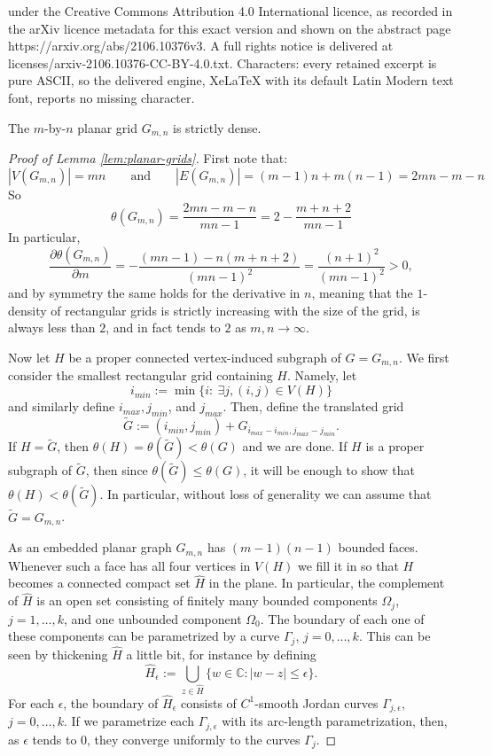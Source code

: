 \documentclass[10pt,a4paper]{amsart}
\newcommand{\C}{\mathbb{C}}
\newcommand{\Ga}{\Gamma }
\newcommand{\Om}{\Omega }
\newcommand{\ep}{\epsilon }
\begin{document}
under the Creative Commons Attribution 4.0 International licence, as recorded in the arXiv licence metadata for this exact version and shown on the abstract page https://arxiv.org/abs/2106.10376v3. A full rights notice is delivered at licenses/arxiv-2106.10376-CC-BY-4.0.txt. Characters: every retained excerpt is pure ASCII, so the delivered engine, XeLaTeX with its default Latin Modern text font, reports no missing character.
\begin{lemma}\label{lem:planar-grids}
 The $m$-by-$n$ planar grid $G_{m,n}$ is strictly dense.
\end{lemma}

\begin{proof}[Proof of Lemma \ref{lem:planar-grids}]
First note that:
\[
|V(G_{m,n})|=mn\qquad\text{and}\qquad |E(G_{m,n})|=(m-1)n+m(n-1)=2mn-m-n
\]
So
\[
\theta(G_{m,n})=\frac{2mn-m-n}{mn-1}=2-\frac{m+n+2}{mn-1}
\]
In particular,
\[
\frac{\partial \theta(G_{m,n})}{\partial m}=-\frac{(mn-1)-n(m+n+2)}{(mn-1)^2}=\frac{(n+1)^2}{(mn-1)^2}>0,
\]
and by symmetry the same holds for the derivative in $n$, meaning that the $1$-density of rectangular grids is strictly increasing with the size of the grid, is always less than $2$, and in fact tends to $2$ as $m,n\rightarrow\infty$.

Now let $H$ be a proper connected vertex-induced subgraph of $G=G_{m,n}$. We first consider the smallest rectangular grid containing $H$. Namely, let
\[
i_{min}:=\min\{i:\ \exists j, (i,j)\in V(H)\}
\]
and similarly define $i_{max}, j_{min}$, and $j_{max}$. Then, define the translated grid
\[
\tilde{G}:=(i_{min},j_{min})+G_{i_{max}-i_{min},j_{max}-j_{min}}.
\]
If $H=\tilde{G}$, then $\theta(H)=\theta(\tilde{G})< \theta(G)$ and we are done. If $H$ is a proper subgraph of $\tilde{G}$, then since $\theta(\tilde{G})\le \theta(G)$, it will be enough to show that $\theta(H)<\theta(\tilde{G})$. In particular, without loss of generality we can assume that $\tilde{G}=G_{m,n}$.


As an embedded planar graph $G_{m,n}$ has $(m-1)(n-1)$ bounded faces. Whenever such a face has all four vertices in $V(H)$ we fill it in so that $H$ becomes a connected compact set $\hat{H}$ in the plane. In particular, the complement of $\hat{H}$ is an open set consisting of finitely many bounded components $\Om_j$, $j=1,\dots,k$, and one unbounded component $\Om_0$. The boundary of each one of these components can be parametrized by a curve $\Ga_j$, $j=0,\dots,k$. This can be seen by thickening $\hat{H}$ a little bit, for instance by defining
\[
\hat{H}_\ep:=\bigcup_{z\in\hat{H}}\{w\in\C: |w-z|\le \ep\}.
\]
For each $\ep$, the boundary of $\hat{H}_\ep$ consists of $C^1$-smooth Jordan curves $\Ga_{j,\ep}$, $j=0,\dots,k$. If we parametrize each $\Ga_{j,\ep}$ with its arc-length parametrization, then, as $\ep$ tends to $0$, they converge uniformly to the curves $\Ga_j$.
 

\end{proof}
\end{document}
